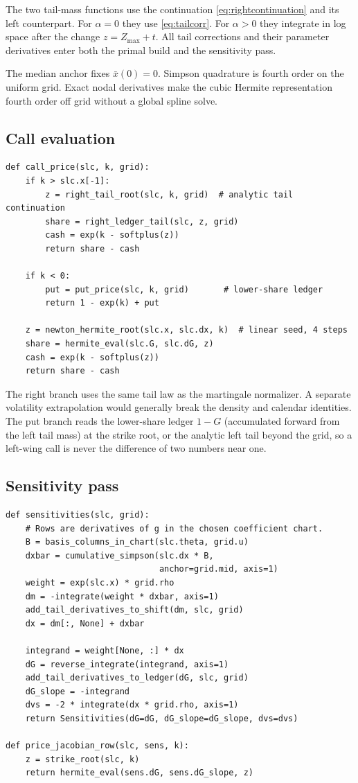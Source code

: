 The two tail-mass functions use the continuation
\eqref{eq:rightcontinuation} and its left counterpart.  For
$\alpha=0$ they use \eqref{eq:tailcorr}.  For $\alpha>0$ they integrate in
log space after the change $z=Z_{\max}+t$.  All tail corrections and their
parameter derivatives enter both the primal build and the sensitivity pass.

The median anchor fixes $\bar x(0)=0$.  Simpson quadrature is fourth order on
the uniform grid.  Exact nodal derivatives make the cubic Hermite
representation fourth order off grid without a global spline solve.

\subsection{Call evaluation}

\begin{lstlisting}[caption={Evaluate one normalized call.}]
def call_price(slc, k, grid):
    if k > slc.x[-1]:
        z = right_tail_root(slc, k, grid)  # analytic tail continuation
        share = right_ledger_tail(slc, z, grid)
        cash = exp(k - softplus(z))
        return share - cash

    if k < 0:
        put = put_price(slc, k, grid)       # lower-share ledger
        return 1 - exp(k) + put

    z = newton_hermite_root(slc.x, slc.dx, k)  # linear seed, 4 steps
    share = hermite_eval(slc.G, slc.dG, z)
    cash = exp(k - softplus(z))
    return share - cash
\end{lstlisting}

The right branch uses the same tail law as the martingale normalizer.  A
separate volatility extrapolation would generally break the density and
calendar identities.  The put branch reads the lower-share ledger
$1-G$ (accumulated forward from the left tail mass) at the strike
root, or the analytic left tail beyond the grid, so a left-wing call
is never the difference of two numbers near one.

\subsection{Sensitivity pass}

\begin{lstlisting}[caption={All fixed-tail parameter sensitivities.}]
def sensitivities(slc, grid):
    # Rows are derivatives of g in the chosen coefficient chart.
    B = basis_columns_in_chart(slc.theta, grid.u)
    dxbar = cumulative_simpson(slc.dx * B,
                               anchor=grid.mid, axis=1)
    weight = exp(slc.x) * grid.rho
    dm = -integrate(weight * dxbar, axis=1)
    add_tail_derivatives_to_shift(dm, slc, grid)
    dx = dm[:, None] + dxbar

    integrand = weight[None, :] * dx
    dG = reverse_integrate(integrand, axis=1)
    add_tail_derivatives_to_ledger(dG, slc, grid)
    dG_slope = -integrand
    dvs = -2 * integrate(dx * grid.rho, axis=1)
    return Sensitivities(dG=dG, dG_slope=dG_slope, dvs=dvs)

def price_jacobian_row(slc, sens, k):
    z = strike_root(slc, k)
    return hermite_eval(sens.dG, sens.dG_slope, z)
\end{lstlisting}

